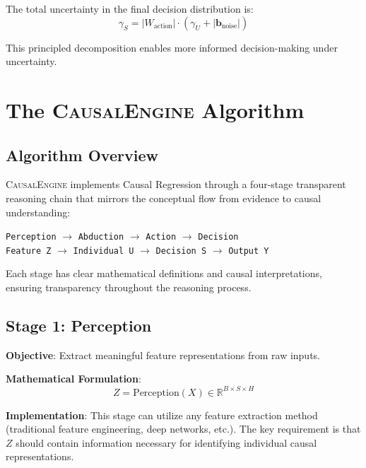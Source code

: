 \documentclass[conference]{IEEEtran}
\newcommand{\causalengine}{\textsc{CausalEngine}}
\newcommand{\reals}{\mathbb{R}}
\begin{document}
The total uncertainty in the final decision distribution is:
\begin{equation}
\gamma_S = |W_{\text{action}}| \cdot (\gamma_U + |\mathbf{b}_{\text{noise}}|)
\end{equation}

This principled decomposition enables more informed decision-making under uncertainty.

\section{The \causalengine{} Algorithm}
\label{sec:algorithm}

\subsection{Algorithm Overview}

\causalengine{} implements Causal Regression through a four-stage transparent reasoning chain that mirrors the conceptual flow from evidence to causal understanding:

\begin{center}
\texttt{Perception} $\rightarrow$ \texttt{Abduction} $\rightarrow$ \texttt{Action} $\rightarrow$ \texttt{Decision}\\
\texttt{Feature Z} $\rightarrow$ \texttt{Individual U} $\rightarrow$ \texttt{Decision S} $\rightarrow$ \texttt{Output Y}
\end{center}

Each stage has clear mathematical definitions and causal interpretations, ensuring transparency throughout the reasoning process.

\subsection{Stage 1: Perception}

\textbf{Objective}: Extract meaningful feature representations from raw inputs.

\textbf{Mathematical Formulation}:
\begin{equation}
Z = \text{Perception}(X) \in \reals^{B \times S \times H}
\end{equation}

\textbf{Implementation}: This stage can utilize any feature extraction method (traditional feature engineering, deep networks, etc.). The key requirement is that $Z$ should contain information necessary for identifying individual causal representations.
\end{document}
